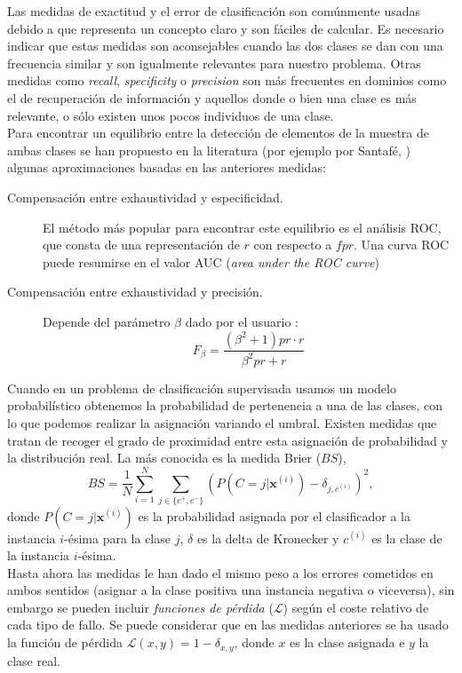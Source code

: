 	Las medidas de exactitud y el error de 
clasificación son comúnmente usadas debido a que representa 
un concepto claro y son fáciles de calcular.  Es necesario 
indicar que estas medidas son aconsejables cuando las dos 
clases se dan con una frecuencia similar y son igualmente 
relevantes para nuestro problema. Otras medidas como 
\textit{recall}, \textit{specificity} o \textit{precision} 
son más frecuentes en dominios como el de recuperación de 
información y aquellos donde o bien una clase es más 
relevante, o sólo existen unos pocos individuos de 
una clase.\\
	Para encontrar un equilibrio entre la detección de 
elementos de la muestra de ambas clases se han propuesto en 
la literatura (por ejemplo por Santafé, 
\cite{DBLP:journals/air/SantafeIL15}) algunas aproximaciones 
basadas en las anteriores medidas:
	
	\begin{description}
		\item[Compensación entre exhaustividad y 
especificidad.] El método más popular para encontrar 
este equilibrio es el análisis ROC, que consta de una 
representación de $r$ con respecto a $fpr$. Una curva ROC 
puede resumirse en el valor AUC (\textit{area under the ROC 
curve})
		\item[Compensación entre exhaustividad y 
precisión.] Depende del parámetro $\beta$ dado por el 
usuario :
		\[ F_\beta = \frac{(\beta^2+1) pr \cdot r}
						  {\beta^2 pr + r}	\]
	\end{description}

	Cuando en un problema de clasificación supervisada usamos 
un modelo probabilístico obtenemos la probabilidad de 
pertenencia a una de las clases, con lo que podemos realizar 
la asignación variando el umbral. Existen medidas que tratan 
de recoger el grado de proximidad entre esta asignación de 
probabilidad y la distribución real. La más conocida es la 
medida Brier ($BS$),
	\[ BS = \frac{1}{N} \sum\limits_{i=1}^N 
		\sum\limits_{j \in \{c^+,c^-\}}
			\left( P \left( C=j|\mathbf{x}^{(i)} \right) -
			\delta_{j,c^{(i)}} \right) ^2,\]
	donde $P\left(C=j|\mathbf{x}^{(i)}\right)$ es la 
probabilidad asignada por el clasificador a la instancia 
$i$-ésima para la clase $j$, $\delta$ es la delta de 
Kronecker y $c^{(i)}$ es la clase de la instancia 
$i$-ésima.\\
	Hasta ahora las medidas le han dado el mismo peso a los 
errores cometidos en ambos sentidos (asignar a la clase 
positiva una instancia negativa o viceversa), sin embargo se 
pueden incluir \textit{funciones de pérdida} ($\mathcal{L}$) 
según el coste relativo de cada tipo de fallo. Se 
puede considerar que en las medidas anteriores se ha usado 
la función de pérdida 
$\mathcal{L}(x,y) = 1 - \delta_{x,y} $, donde $x$ es la clase 
asignada e $y$ la clase real.
	
